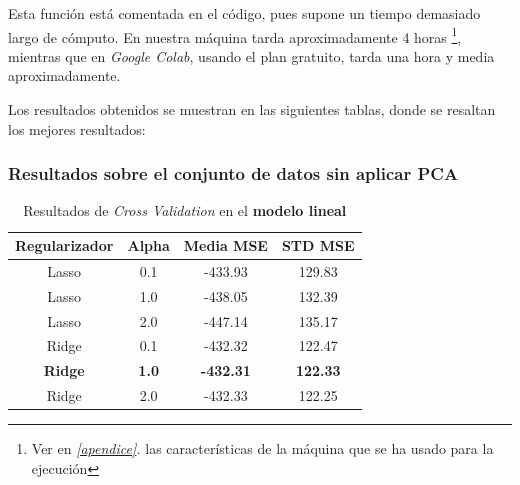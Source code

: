 \documentclass[11pt]{article}
\begin{document}
Esta función está comentada en el código, pues supone un tiempo demasiado largo de cómputo. En nuestra máquina tarda aproximadamente 4 horas \footnote{Ver en \emph{\ref{apendice}. } las características de la máquina que se ha usado para la ejecución}, mientras que en \emph{Google Colab}, usando el plan gratuito, tarda una hora y media aproximadamente.

Los resultados obtenidos se muestran en las siguientes tablas, donde se resaltan los mejores resultados:

\subsubsection{Resultados sobre el conjunto de datos sin aplicar PCA}

\begin{table}[H]
  \centering
  \begin{tabular}{|c|c|c|c|}
  \hline
    \textbf{Regularizador} & \textbf{Alpha} & \textbf{Media MSE} & \textbf{STD MSE} \\
    \hline
    Lasso & 0.1 &  -433.93 & 129.83 \\
    Lasso & 1.0 &  -438.05 & 132.39 \\
    Lasso & 2.0 &  -447.14 & 135.17 \\
    Ridge & 0.1 & -432.32  & 122.47  \\
    \textbf{Ridge} & \textbf{1.0}    & \textbf{-432.31}& \textbf{122.33}  \\
    Ridge & 2.0  & -432.33 & 122.25  \\
    \hline
  \end{tabular}
  \caption{Resultados de \emph{Cross Validation} en el \textbf{modelo lineal}}
\end{table}
\end{document}

